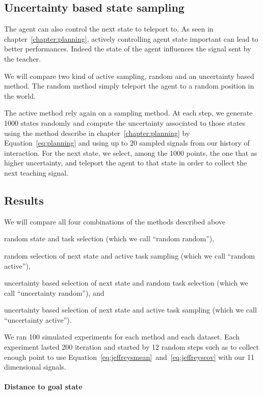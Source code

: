 \subsection{Uncertainty based state sampling}

The agent can also control the next state to teleport to. As seen in chapter~\ref{chapter:planning}, actively controlling agent state important can lead to better performances. Indeed the state of the agent influences the signal sent by the teacher. 

We will compare two kind of active sampling, random and an uncertainty based method. The random method simply teleport the agent to a random position in the world. 

The active method rely again on a sampling method. At each step, we generate 1000 states randomly and compute the uncertainty associated to those states using the method describe in chapter~\ref{chapter:planning} by Equation~\ref{eq:planning} and using up to 20 sampled signals from our history of interaction. For the next state, we select, among the 1000 points, the one that as higher uncertainty, and teleport the agent to that state in order to collect the next teaching signal.

\subsection{Results}

We will compare all four combinations of the methods described above \begin{inparaenum}[a)] \item random state and task selection (which we call ``random random''), \item random selection of next state and active task sampling (which we call ``random active''), \item uncertainty based selection of next state and random task selection (which we call ``uncertainty random''), and \item uncertainty based selection of next state and active task sampling (which we call ``uncertainty active''). \end{inparaenum}

We ran 100 simulated experiments for each method and each dataset. Each experiment lasted 200 iteration and started by 12 random steps such as to collect enough point to use Equation~\ref{eq:jeffreysmean}~and~\ref{eq:jeffreyscov} with our 11 dimensional signals.

\paragraph{Distance to goal state}

